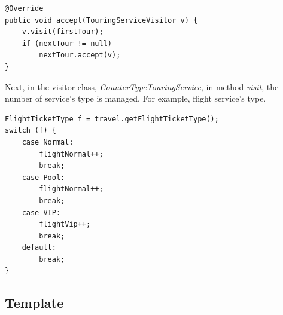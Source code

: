 \begin{lstlisting}
@Override
public void accept(TouringServiceVisitor v) {
	v.visit(firstTour);
	if (nextTour != null)
		nextTour.accept(v);
}
\end{lstlisting}

\newpage
Next, in the visitor class, \textit{CounterTypeTouringService}, in method \textit{visit}, the number of service's type is managed. For example, flight service's type.

\begin{lstlisting}
FlightTicketType f = travel.getFlightTicketType();
switch (f) {
	case Normal:
		flightNormal++;
		break;
	case Pool:
		flightNormal++;
		break;
	case VIP:
		flightVip++;
		break;
	default:
		break;
}

\end{lstlisting}

\newpage
\subsection{Template}


















